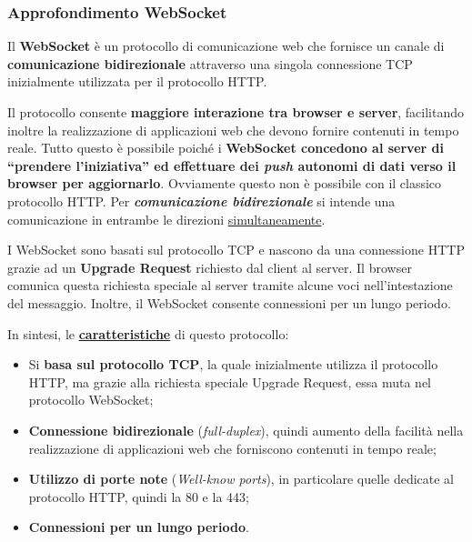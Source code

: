 \documentclass[a4paper]{article}
\newcommand{\dquotes}[1]{``#1''}
\begin{document}
	\subsubsection{Approfondimento WebSocket}
	
	Il \textbf{WebSocket} è un protocollo di comunicazione web che fornisce un canale di \textbf{comunicazione bidirezionale} attraverso una singola connessione TCP inizialmente utilizzata per il protocollo HTTP.
	
	Il protocollo consente \textbf{maggiore interazione tra browser e server}, facilitando inoltre la realizzazione di applicazioni web che devono fornire contenuti in tempo reale. Tutto questo è possibile poiché i \textbf{WebSocket concedono al server di \dquotes{prendere l'iniziativa} ed effettuare dei \emph{push} autonomi di dati verso il browser per aggiornarlo}. Ovviamente questo non è possibile con il classico protocollo HTTP. Per \textbf{\emph{comunicazione bidirezionale}} si intende una comunicazione in entrambe le direzioni \underline{simultaneamente}.\newline
	
	\noindent
	I WebSocket sono basati sul protocollo TCP e nascono da una connessione HTTP grazie ad un \textbf{Upgrade Request} richiesto dal client al server. Il browser comunica questa richiesta speciale al server tramite alcune voci nell'intestazione del messaggio. Inoltre, il WebSocket consente connessioni per un lungo periodo.\newline
	
	\noindent
	In sintesi, le \textbf{\underline{caratteristiche}} di questo protocollo:
	\begin{itemize}
		\item Si \textbf{basa sul protocollo TCP}, la quale inizialmente utilizza il protocollo HTTP, ma grazie alla richiesta speciale Upgrade Request, essa muta nel protocollo WebSocket;
		
		\item \textbf{Connessione bidirezionale} (\emph{full-duplex}), quindi aumento della facilità nella realizzazione di applicazioni web che forniscono contenuti in tempo reale;
		
		\item \textbf{Utilizzo di porte note} (\emph{Well-know ports}), in particolare quelle dedicate al protocollo HTTP, quindi la 80 e la 443;
		
		\item \textbf{Connessioni per un lungo periodo}.
	\end{itemize}
\end{document}
